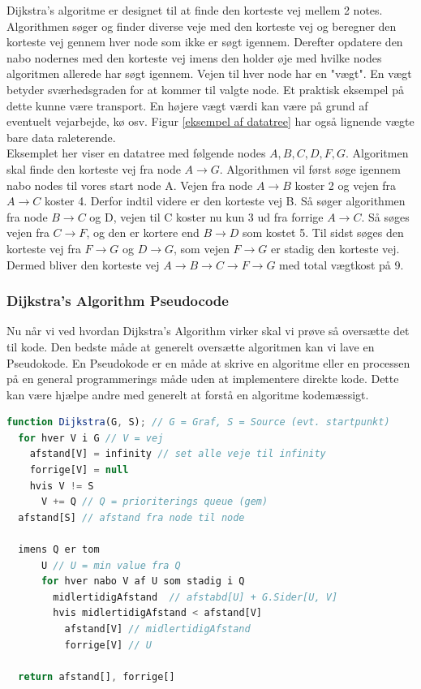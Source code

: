 \documentclass[12pt]{article}
\begin{document}
Dijkstra’s algoritme er designet til at finde den korteste vej mellem 2 notes. Algorithmen søger og finder diverse veje med den korteste vej og beregner den korteste vej gennem hver node som ikke er søgt igennem. Derefter opdatere den nabo nodernes med den korteste vej imens den holder øje med hvilke nodes algoritmen allerede har søgt igennem. Vejen til hver node har en "vægt". En vægt betyder sværhedsgraden for at kommer til valgte node. Et praktisk eksempel på dette kunne være transport. En højere vægt værdi kan være på grund af eventuelt vejarbejde, kø osv. Figur \ref{eksempel af datatree} har også lignende vægte bare data raleterende.
\\Eksemplet her viser en datatree med følgende nodes $A,B,C,D,F,G$. Algoritmen skal finde den korteste vej fra node $A \rightarrow G$. Algorithmen vil først søge igennem nabo nodes til vores start node A. Vejen fra node $A \rightarrow B$ koster 2 og vejen fra $A \rightarrow C$ koster 4. Derfor indtil videre er den korteste vej B. Så søger algorithmen fra node $B \rightarrow C$ og D, vejen til C koster nu kun 3 ud fra forrige $A \rightarrow C$. Så søges vejen fra $C \rightarrow F$, og den er kortere end $B \rightarrow D$ som kostet 5. Til sidst søges den korteste vej fra $F \rightarrow G$ og $D \rightarrow G$, som vejen $F \rightarrow G$ er stadig den korteste vej. Dermed bliver den korteste vej $A \rightarrow B \rightarrow C \rightarrow F \rightarrow G$ med total vægtkost på 9. 

\subsubsection{Dijkstra’s Algorithm Pseudocode}
Nu når vi ved hvordan Dijkstra’s Algorithm virker skal vi prøve så oversætte det til kode.
Den bedste måde at generelt oversætte algoritmen kan vi lave en Pseudokode. En Pseudokode er en måde at skrive en algoritme eller en processen på en general programmerings måde uden at implementere direkte kode. Dette kan være hjælpe andre med generelt at forstå en algoritme kodemæssigt. 

\begin{lstlisting}[language=JavaScript, caption=Dijkstra’s Algorithm Pseudocode oversat til dansk]
function Dijkstra(G, S); // G = Graf, S = Source (evt. startpunkt)
  for hver V i G // V = vej
    afstand[V] = infinity // set alle veje til infinity
    forrige[V] = null
    hvis V != S
      V += Q // Q = prioriterings queue (gem)
  afstand[S] // afstand fra node til node

  imens Q er tom
      U // U = min value fra Q
      for hver nabo V af U som stadig i Q
        midlertidigAfstand  // afstabd[U] + G.Sider[U, V]
        hvis midlertidigAfstand < afstand[V]
          afstand[V] // midlertidigAfstand
          forrige[V] // U

  return afstand[], forrige[]
\end{lstlisting}
\newpage
\end{document}

